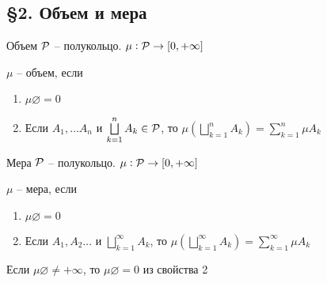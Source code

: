 \documentclass[12pt]{article}
\begin{document}
\newpage

\subsection{§2. Объем и мера}

\begin{defin}{Объем}
    $\P$ -- полукольцо. $\mu : \P \to [0, + \infty]$

    $\mu$ -- объем, если 

    \begin{enumerate}
        \item $\mu \varnothing = 0$
        \item Если $A_1, \ldots A_n$ и $\bigsqcup\limits_{k = 1}^n A_k \in \P$, то $\mu(\bigsqcup\limits_{k = 1}^n A_k) = \sum\limits_{k = 1}^n \mu A_k$
    \end{enumerate}
\end{defin}

\begin{defin}{Мера}
    $\P$ -- полукольцо. $\mu : \P \to [0, + \infty]$

    $\mu$ -- мера, если 

    \begin{enumerate}
        \item $\mu \varnothing = 0$
        \item Если $A_1, A_2 \ldots$ и $\bigsqcup\limits_{k = 1}^\infty A_k$, то $\mu(\bigsqcup\limits_{k = 1}^\infty A_k) = \sum\limits_{k = 1}^\infty \mu A_k$
    \end{enumerate}
\end{defin}

\begin{Exercise}{}
    Если $\mu \varnothing \neq +\infty$, то $\mu \varnothing = 0$ из свойства 2
\end{Exercise}
\end{document}
